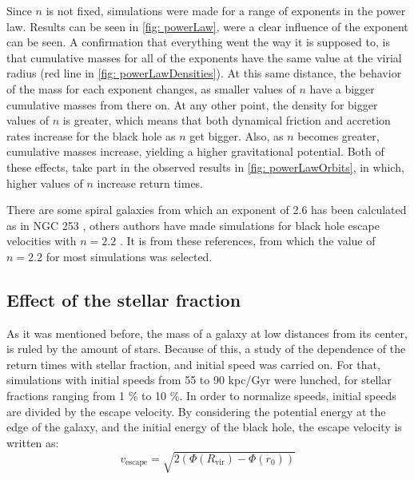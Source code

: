 		Since $n$ is not fixed, simulations were made for a range of exponents in the power law. Results can be seen in \autoref{fig: powerLaw}, were a clear influence of the exponent can be seen. A confirmation that everything went the way it is supposed to, is that cumulative masses for all of the exponents have the same value at the virial radius (red line in \autoref{fig: powerLawDensities}). At this same distance, the behavior of the mass for each exponent changes, as smaller values of $n$ have a bigger cumulative masses from there on. At any other point, the density for bigger values of $n$ is greater, which means that both dynamical friction and accretion rates increase for the black hole as $n$ get bigger. Also, as $n$ becomes greater, cumulative masses increase, yielding a higher gravitational potential. Both of these effects, take part in the observed results in \autoref{fig: powerLawOrbits}, in which, higher values of $n$ increase return times.
		
		There are some spiral galaxies from which an exponent of 2.6 has been calculated as in NGC 253 \cite{sorai2000distribution}, others authors have made simulations for black hole escape velocities with $n = 2.2$ \cite{tanaka2009assembly, choksi2017recoiling}. It is from these references, from which the value of $n = 2.2$ for most simulations was selected.
		
	\subsection{Effect of the stellar fraction}
		As it was mentioned before, the mass of a galaxy at low distances from its center, is ruled by the amount of stars. Because of this, a study of the dependence of the return times with stellar fraction, and initial speed was carried on. For that, simulations with initial speeds from 55 to 90 kpc/Gyr were lunched, for stellar fractions ranging from 1 \% to 10 \%. In order to normalize speeds, initial speeds are divided by the escape velocity. By considering the potential energy at the edge of the galaxy, and the initial energy of the black hole, the escape velocity is written as:
		\begin{equation}
			v_\text{escape} = \sqrt{2 \left(\Phi(R_\text{vir}) - \Phi(r_0)\right)}
		\end{equation}
		
